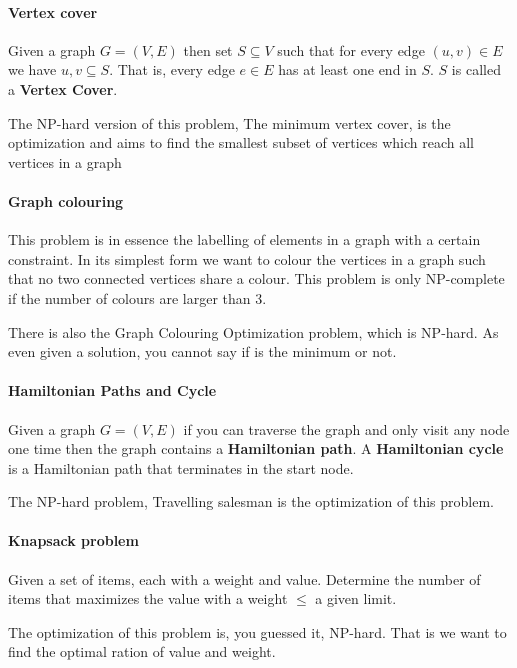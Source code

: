 \documentclass[12pt]{article} %
\begin{document}
\paragraph{Vertex cover}
Given a graph $G = (V, E)$ then set $S \subseteq V$ such that for every edge $(u, v) \in E$ we have ${u, v} \subseteq S$. That is, every edge $e \in E$ has at least one end in $S$. $S$ is called a \textbf{Vertex Cover}.

\par The NP-hard version of this problem, The minimum vertex cover, is the optimization and aims to find the smallest subset of vertices which reach all vertices in a graph 

\paragraph{Graph colouring}
This problem is in essence the labelling of elements in a graph with a certain constraint. In its simplest form we want to colour the vertices in a graph such that no two connected vertices share a colour. This problem is only NP-complete if the number of colours are larger than 3.

\par There is also the Graph Colouring Optimization problem, which is NP-hard. As even given a solution, you cannot say if is the minimum or not.

\paragraph{Hamiltonian Paths and Cycle}
Given a graph $G = (V, E)$ if you can traverse the graph and only visit any node one time then the graph contains a \textbf{Hamiltonian path}. A \textbf{Hamiltonian cycle} is a Hamiltonian path that terminates in the start node.

\par The NP-hard problem, Travelling salesman is the optimization of this problem.

\paragraph{Knapsack problem}
Given a set of items, each with a weight and value. Determine the number of items that maximizes the value with a weight $\leq$ a given limit.  

\par The optimization of this problem is, you guessed it, NP-hard. That is we want to find the optimal ration of value and weight.
\end{document}
